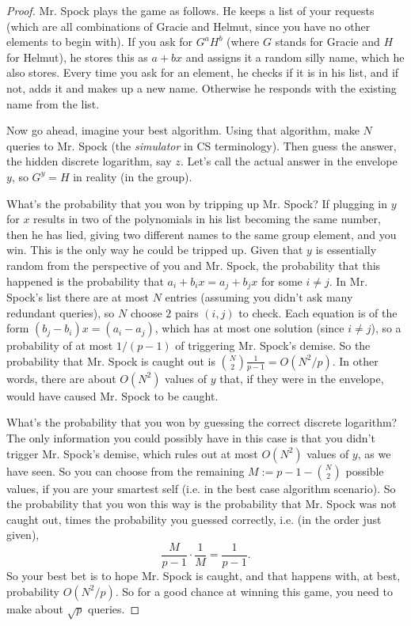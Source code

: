 \documentclass{article}
\theoremstyle{plain}
\theoremstyle{definition}
\theoremstyle{remark}
\numberwithin{theorem}{section}
\begin{document}
    \begin{proof}
Mr. Spock plays the game as follows.  He keeps a list of your requests (which are all combinations of Gracie and Helmut, since you have no other elements to begin with). If you ask for $G^a H^b$ (where $G$ stands for Gracie and $H$ for Helmut), he stores this as $a + bx$ and assigns it a random silly name, which he also stores.  Every time you ask for an element, he checks if it is in his list, and if not, adds it and makes up a new name.  Otherwise he responds with the existing name from the list.
    
    Now go ahead, imagine your best algorithm.  Using that algorithm, make $N$ queries to Mr. Spock (the \emph{simulator} in CS terminology).  Then guess the answer, the hidden discrete logarithm, say $z$.  Let's call the actual answer in the envelope $y$, so $G^y = H$ in reality (in the group).
    
    What's the probability that you won by tripping up Mr. Spock?  If plugging in $y$ for $x$ results in two of the polynomials in his list becoming the same number, then he has lied, giving two different names to the same group element, and you win.  This is the only way he could be tripped up.  Given that $y$ is essentially random from the perspective of you and Mr. Spock, the probability that this happened is the probability that $a_i + b_i x = a_j + b_j x$ for some $i \neq j$.  In Mr. Spock's list there are at most $N$ entries (assuming you didn't ask many redundant queries), so $N$ choose $2$ pairs $(i,j)$ to check.  Each equation is of the form $(b_j-b_i)x = (a_i-a_j)$, which has at most one solution (since $i \neq j$), so a probability of at most $1/(p-1)$ of triggering Mr. Spock's demise.  So the probability that Mr. Spock is caught out is ${{N}\choose{2}} \frac{1}{p-1} = O(N^2/p)$.  In other words, there are about $O(N^2)$ values of $y$ that, if they were in the envelope, would have caused Mr. Spock to be caught.

    What's the probability that you won by guessing the correct discrete logarithm?  The only information you could possibly have in this case is that you didn't trigger Mr. Spock's demise, which rules out at most $O(N^2)$ values of $y$, as we have seen.  So you can choose from the remaining $M := p-1 - {{N}\choose{2}}$ possible values, if you are your smartest self (i.e. in the best case algorithm scenario).  So the probability that you won this way is the probability that Mr. Spock was not caught out, times the probability you guessed correctly, i.e. (in the order just given),
    \[
    \frac{M}{p-1} \cdot \frac{1}{M} = \frac{1}{p-1}.
    \]
    So your best bet is to hope Mr. Spock is caught, and that happens with, at best, probability $O(N^2/p)$.  So for a good chance at winning this game, you need to make about $\sqrt{p}$ queries.
\end{proof}
\end{document}
